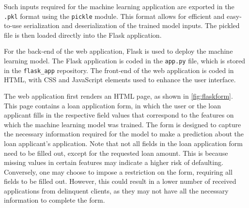Such inputs required for the machine learning application are exported in the \lstinline{.pkl} format using the \lstinline{pickle} module. This format allows for efficient and easy-to-use serialization and deserialization of the trained model inputs. The pickled file is then loaded directly into the Flask application.

For the back-end of the web application, Flask is used to deploy the machine learning model. The Flask application is coded in the \lstinline{app.py} file, which is stored in the \lstinline{flask_app} repository. The front-end of the web application is coded in HTML, with CSS and JavaScript elements used to enhance the user interface.
 
The web application first renders an HTML page, as shown in \autoref{fig:flaskform}.
This page contains a loan application form, in which the user or the loan applicant fills in the respective field values that correspond to the features on which the machine learning model was trained.
The form is designed to capture the necessary information required for the model to make a prediction about the loan applicant's application.
Note that not all fields in the loan application form need to be filled out, except for the requested loan amount. This is because missing values in certain features may indicate a higher risk of defaulting. Conversely, one may choose to impose a restriction on the form, requiring all fields to be filled out. However, this could result in a lower number of received applications from delinquent clients, as they may not have all the necessary information to complete the form.

